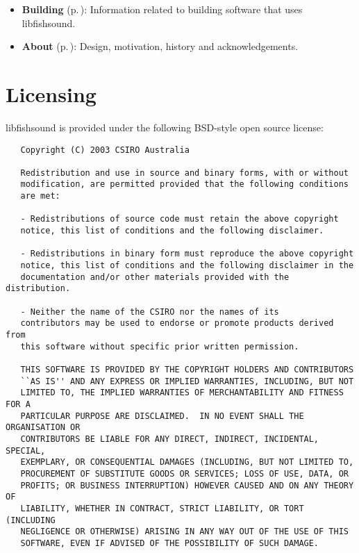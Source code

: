 \begin{itemize}
\item {\bf Building }{\rm (p.\,\pageref{group__building})}: Information related to building software that uses libfishsound.\end{itemize}


\begin{itemize}
\item {\bf About }{\rm (p.\,\pageref{group__about})}: Design, motivation, history and acknowledgements.\end{itemize}
\section{Licensing}\label{index_Licensing}
libfishsound is provided under the following BSD-style open source license:



\footnotesize\begin{verbatim}   Copyright (C) 2003 CSIRO Australia

   Redistribution and use in source and binary forms, with or without
   modification, are permitted provided that the following conditions
   are met:
   
   - Redistributions of source code must retain the above copyright
   notice, this list of conditions and the following disclaimer.
   
   - Redistributions in binary form must reproduce the above copyright
   notice, this list of conditions and the following disclaimer in the
   documentation and/or other materials provided with the distribution.
   
   - Neither the name of the CSIRO nor the names of its
   contributors may be used to endorse or promote products derived from
   this software without specific prior written permission.
   
   THIS SOFTWARE IS PROVIDED BY THE COPYRIGHT HOLDERS AND CONTRIBUTORS
   ``AS IS'' AND ANY EXPRESS OR IMPLIED WARRANTIES, INCLUDING, BUT NOT
   LIMITED TO, THE IMPLIED WARRANTIES OF MERCHANTABILITY AND FITNESS FOR A
   PARTICULAR PURPOSE ARE DISCLAIMED.  IN NO EVENT SHALL THE ORGANISATION OR
   CONTRIBUTORS BE LIABLE FOR ANY DIRECT, INDIRECT, INCIDENTAL, SPECIAL,
   EXEMPLARY, OR CONSEQUENTIAL DAMAGES (INCLUDING, BUT NOT LIMITED TO,
   PROCUREMENT OF SUBSTITUTE GOODS OR SERVICES; LOSS OF USE, DATA, OR
   PROFITS; OR BUSINESS INTERRUPTION) HOWEVER CAUSED AND ON ANY THEORY OF
   LIABILITY, WHETHER IN CONTRACT, STRICT LIABILITY, OR TORT (INCLUDING
   NEGLIGENCE OR OTHERWISE) ARISING IN ANY WAY OUT OF THE USE OF THIS
   SOFTWARE, EVEN IF ADVISED OF THE POSSIBILITY OF SUCH DAMAGE.

\end{verbatim}
\normalsize
 